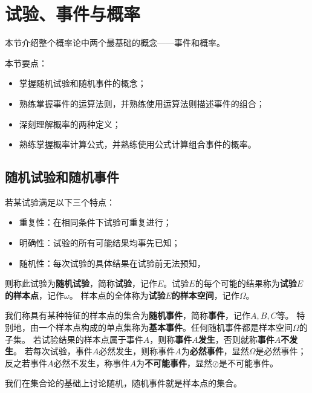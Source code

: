 \section{试验、事件与概率}

本节介绍整个概率论中两个最基础的概念——事件和概率。

本节要点：
\begin{itemize}
    \item 掌握随机试验和随机事件的概念；
    \item 熟练掌握事件的运算法则，并熟练使用运算法则描述事件的组合；
    \item 深刻理解概率的两种定义；
    \item 熟练掌握概率计算公式，并熟练使用公式计算组合事件的概率。
\end{itemize}

\subsection{随机试验和随机事件}

\begin{definition}[随机试验]
若某试验满足以下三个特点：
\begin{itemize}
    \item 重复性：在相同条件下试验可重复进行；
    \item 明确性：试验的所有可能结果均事先已知；
    \item 随机性：每次试验的具体结果在试验前无法预知，
\end{itemize}
则称此试验为{\bf 随机试验}，简称{\bf 试验}，记作$E$。试验$E$的每个可能的结果称为{\bf 试验$E$的样本点}，记作$\omega $。
样本点的全体称为{\bf 试验$E$的样本空间}，记作$\varOmega $。
\end{definition}

\begin{definition}[随机事件]
我们称具有某种特征的样本点的集合为{\bf 随机事件}，简称{\bf 事件}，记作$A,B,C$等。
特别地，由一个样本点构成的单点集称为{\bf 基本事件}。任何随机事件都是样本空间$\varOmega $的子集。
若试验结果的样本点属于事件$A$，则称{\bf 事件$A$发生}，否则就称{\bf 事件$A$不发生}。
若每次试验，事件$A$必然发生，则称事件$A$为{\bf 必然事件}，显然$\varOmega $是必然事件；反之若事件$A$必然不发生，称事件$A$为{\bf 不可能事件}，显然$\oslash $是不可能事件。
\end{definition}

我们在集合论的基础上讨论随机，随机事件就是样本点的集合。

